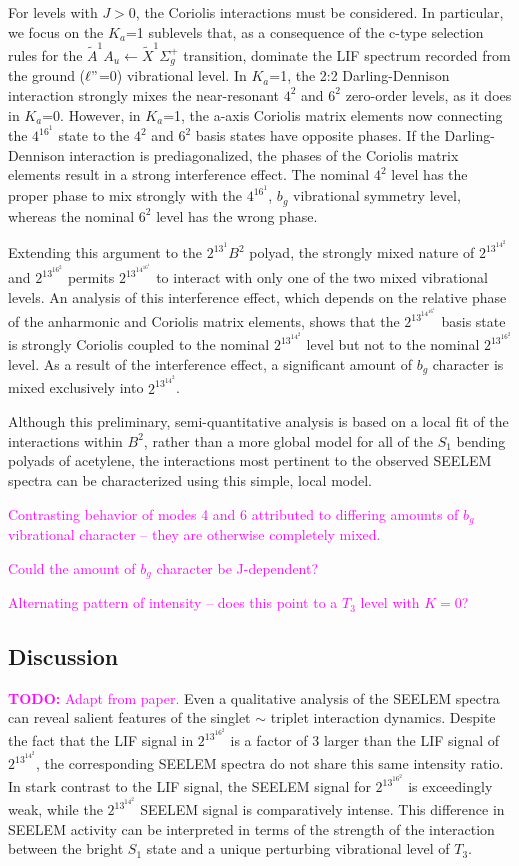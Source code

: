 \documentclass[12pt]{mitthesis}
\newcommand{\TODO} [1]{\textcolor{magenta}{\textbf{TODO:} #1}}
\newcommand{\POINT}[1]{\textcolor{magenta}{#1}}
\begin{document}
For levels with $J>0$, the Coriolis interactions must be
considered. In particular, we focus on the $K_a$=1 sublevels that, as
a consequence of the c-type selection rules for the $\tilde{A}^1A_u
\leftarrow \tilde{X} ^1\Sigma_g^+$ transition, dominate the LIF
spectrum recorded from the ground ($\ell"$=0) vibrational level. In
$K_a$=1, the 2:2 Darling-Dennison interaction strongly mixes the
near-resonant $4^2$ and $6^2$ zero-order levels, as it does in
$K_a$=0. However, in $K_a$=1, the a-axis Coriolis matrix elements now
connecting the $4^16^1$ state to the $4^2$ and $6^2$ basis states have
opposite phases. If the Darling-Dennison interaction is
prediagonalized, the phases of the Coriolis matrix elements result in
a strong interference effect. The nominal $4^2$ level has the proper
phase to mix strongly with the $4^16^1$, $b_g$ vibrational symmetry
level, whereas the nominal $6^2$ level has the wrong phase.

Extending this argument to the $2^13^1B^2$ polyad, the strongly mixed
nature of $2^13^14^2$ and $2^13^16^2$ permits $2^13^14^16^1$ to
interact with only one of the two mixed vibrational levels. An
analysis of this interference effect, which depends on the relative
phase of the anharmonic and Coriolis matrix elements, shows that the
 $2^13^14^16^1$ basis state is strongly Coriolis coupled to the nominal
$2^13^14^2$ level but not to the nominal $2^13^16^2$ level. As a result
of the interference effect, a significant amount of $b_g$ character is
mixed exclusively into $2^13^14^2$.

Although this preliminary, semi-quantitative analysis is based on a
local fit of the interactions within $B^2$, rather than a more global
model for all of the $S_1$ bending polyads of acetylene, the interactions
most pertinent to the observed SEELEM spectra can be characterized
using this simple, local model.

\POINT{Contrasting behavior of modes 4 and 6 attributed to differing
  amounts of $b_g$ vibrational character -- they are otherwise
  completely mixed.}

\POINT{Could the amount of $b_g$ character be J-dependent?}

\POINT{Alternating pattern of intensity -- does this point to a $T_3$
  level with $K=0$?}

\subsection{Discussion}

\TODO{Adapt from paper.}  Even a qualitative analysis of the SEELEM
spectra can reveal salient features of the singlet $\sim$ triplet
interaction dynamics. Despite the fact that the LIF signal in
$2^13^16^2$ is a factor of 3 larger than the LIF signal of
$2^13^14^2$, the corresponding SEELEM spectra do not share this same
intensity ratio. In stark contrast to the LIF signal, the SEELEM
signal for $2^13^16^2$ is exceedingly weak, while the $2^13^14^2$
SEELEM signal is comparatively intense. This difference in SEELEM
activity can be interpreted in terms of the strength of the
interaction between the bright $S_1$ state and a unique perturbing
vibrational level of $T_3$.
\end{document}
